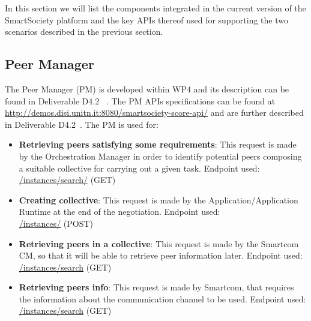 In this section we will list the components integrated in the current
version of the SmartSociety platform and the key APIs thereof
used for supporting the two scenarios described in the previous
section.

\subsection{Peer Manager}
The Peer Manager (PM) is developed within WP4 and its description can
be found in Deliverable D4.2~\cite{D4.2} . The PM APIs specifications can be found at
\url{http://demos.disi.unitn.it:8080/smartsociety-score-api/} and are further
described in Deliverable D4.2~\cite{D4.2}. The PM is used for:
\begin{itemize}
\item {\bf Retrieving peers satisfying some requirements}: This
  request is made by the Orchestration Manager in order to identify
  potential peers composing a suitable collective for carrying out a
  given task. Endpoint used:\\
	\url{/instances/search/} (\textsc{GET})
\item {\bf Creating collective}: This request is made by the Application/Application Runtime at the end of the negotiation. Endpoint used:\\
	\url{/instances/} (\textsc{POST})
\item {\bf Retrieving peers in a collective}: This request is made by
  the Smartcom CM, so that it will be able to retrieve peer information later. Endpoint used:\\
	\url{/instances/search} (\textsc{GET})
\item {\bf Retrieving peers info}: This request is made by Smartcom, that requires the information about the communication channel to be used. Endpoint used:\\
	\url{/instances/search} (\textsc{GET})	
\end{itemize}


